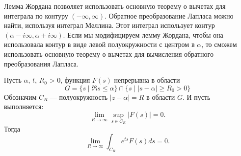 \documentclass[../paper.tex]{subfile}
\begin{document}
Лемма Жордана позволяет использовать основную теорему о вычетах для интеграла по контуру $(-\infty, \infty)$.
Обратное преобразование Лапласа можно найти, используя интеграл Меллина. Этот интеграл использует контур $(\alpha - i\infty, \alpha + i\infty)$.
Если мы модифицируем лемму Жордана, чтобы она использовала контур в виде левой полуокружности с центром в $\alpha$, то сможем использовать основную теорему о вычетах для вычисления обратного преобразования Лапласа.
%
\begin{Th*} $ $ \\
Пусть $\alpha$, $t$, $R_0$ > 0, 
функция $F(s)$ непрерывна в области 
\[
	G = \{s \mid \Re s \le  \alpha \} \cap \{ s \mid |s-\alpha| \ge  R_0 > 0 \}
\]
Обозначим $C_R$ --- полуокружность $|z-\alpha| = R$ в области $G$.
И пусть выполняется:
\[
	\lim\limits_{R \to \infty} \sup\limits_{s \in C_R} |F(s)| = 0
.\]
Тогда
\[
	\lim_{R \to \infty} \int_{C_R} e^{ts} F(s)ds = 0
.\]
\end{Th*}
\end{document}
